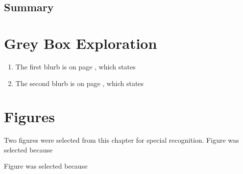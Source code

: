 \documentclass[12pt]{article}
\begin{document}
\subsection{Summary}

\section{Grey Box Exploration}

\begin{enumerate}
  \item The first blurb is on page , which states \textit{}

  \item The second blurb is on page , which states \textit{}
\end{enumerate}

\section{Figures}

Two figures were selected from this chapter for special recognition. Figure was selected because


Figure was selected because


\end{document}
